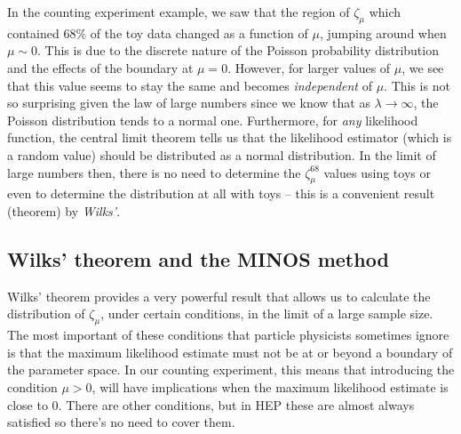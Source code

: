 In the counting experiment example, we saw that the region of $\zeta_{\mu}$ which contained 68\% of the toy data changed as a function of $\mu$, jumping around when $\mu\sim 0$. This is due to the discrete nature of the Poisson probability distribution and the effects of the boundary at $\mu=0$. However, for larger values of $\mu$, we see that this value seems to stay the same and becomes \emph{independent} of $\mu$. This is not so surprising given the law of large numbers since we know that as $\lambda\rightarrow \infty$, the Poisson distribution tends to a normal one. Furthermore, for \emph{any} likelihood function, the central limit theorem tells us that the likelihood estimator (which is a random value) should be distributed as a normal distribution. In the limit of large numbers then, there is no need to determine the $\zeta_{\mu}^{68}$ values using toys or even to determine the distribution at all with toys -- this is a convenient result (theorem) by \emph{Wilks'}. 

\subsection{Wilks' theorem and the MINOS method}
Wilks' theorem provides a very powerful result that allows us to calculate the distribution of $\zeta_{\mu}$, under certain conditions, in the limit of a large sample size. The most important of these conditions that particle physicists sometimes ignore is that the maximum likelihood estimate must not be at or beyond a boundary of the parameter space. In our counting experiment, this means that introducing the condition $\mu>0$, will have implications when the maximum likelihood estimate is close to 0. There are other conditions, but in HEP these are almost always satisfied so there's no need to cover them. 


